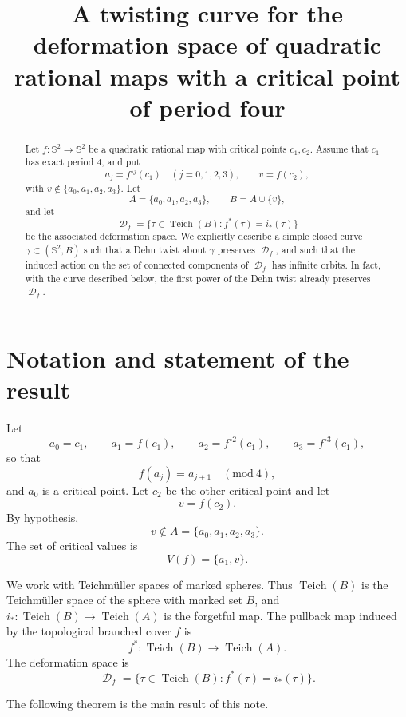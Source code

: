 \documentclass[11pt]{article}
\title{A twisting curve for the deformation space of quadratic rational maps with a critical point of period four}
\author{}
\date{}
\theoremstyle{plain}
\theoremstyle{definition}
\DeclareMathOperator{\Teich}{Teich}
\DeclareMathOperator{\D}{\mathcal D}
\newcommand{\Sph}{\mathbb S^2}
\begin{document}
\maketitle

\begin{abstract}
Let \(f:\Sph\to\Sph\) be a quadratic rational map with critical points \(c_1,c_2\). Assume that \(c_1\) has exact period \(4\), and put
\[
a_j=f^{\circ j}(c_1)\quad (j=0,1,2,3),\qquad v=f(c_2),
\]
with \(v\notin\{a_0,a_1,a_2,a_3\}\). Let
\[
A=\{a_0,a_1,a_2,a_3\},\qquad B=A\cup\{v\},
\]
and let
\[
\D_f=\{\tau\in \Teich(B): f^*(\tau)=i_*(\tau)\}
\]
be the associated deformation space. We explicitly describe a simple closed curve \(\gamma\subset(\Sph,B)\) such that a Dehn twist about \(\gamma\) preserves \(\D_f\), and such that the induced action on the set of connected components of \(\D_f\) has infinite orbits. In fact, with the curve described below, the first power of the Dehn twist already preserves \(\D_f\).
\end{abstract}

\section{Notation and statement of the result}

Let
\[
a_0=c_1,\qquad a_1=f(c_1),\qquad a_2=f^{\circ2}(c_1),\qquad a_3=f^{\circ3}(c_1),
\]
so that
\[
f(a_j)=a_{j+1}\quad(\mathrm{mod}\ 4),
\]
and \(a_0\) is a critical point. Let \(c_2\) be the other critical point and let
\[
v=f(c_2).
\]
By hypothesis,
\[
v\notin A=\{a_0,a_1,a_2,a_3\}.
\]
The set of critical values is
\[
V(f)=\{a_1,v\}.
\]

We work with Teichm\"uller spaces of marked spheres. Thus \(\Teich(B)\) is the Teichm\"uller space of the sphere with marked set \(B\), and \(i_*:\Teich(B)\to \Teich(A)\) is the forgetful map. The pullback map induced by the topological branched cover \(f\) is
\[
f^*:\Teich(B)\longrightarrow \Teich(A).
\]
The deformation space is
\[
\D_f=\{\tau\in \Teich(B): f^*(\tau)=i_*(\tau)\}.
\]

The following theorem is the main result of this note.
\end{document}
